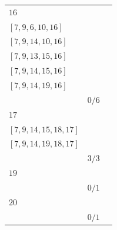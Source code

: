 \documentclass[12pt, a4paper]{extarticle}
\begin{document}
\begin{table}[h!]
\begin{tabularx}{\textwidth}{|X|X|X|}
        \hline
        $16$ & \begin{tabular}{@{}l@{}} $[7, 3, 6, 10, 16]$ \\  $[7, 9, 6, 10, 16]$ \\  $[7, 9, 14, 10, 16]$ \\  $[7, 9, 13, 15, 16]$ \\  $[7, 9, 14, 15, 16]$ \\  $[7, 9, 14, 19, 16]$ \\ \end{tabular} & $0/6$ \\
        \hline
        $17$ & \begin{tabular}{@{}l@{}} $[7, 9, 13, 15, 18, 17]$ \\  $[7, 9, 14, 15, 18, 17]$ \\  $[7, 9, 14, 19, 18, 17]$ \\ \end{tabular} & $3/3$ \\
        \hline
        $19$ & \begin{tabular}{@{}l@{}} $[7, 9, 14, 19]$ \\ \end{tabular} & $0/1$ \\
        \hline
        $20$ & \begin{tabular}{@{}l@{}} $[7, 9, 14, 19, 20]$ \\ \end{tabular} & $0/1$ \\
        \hline
    \end{tabularx}
\end{table}
\end{document}
